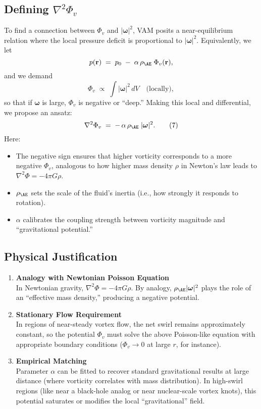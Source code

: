 \documentclass[aps,preprint,superscriptaddress]{revtex4-2}
\begin{document}
    \subsection{Defining \(\nabla^2 \Phi_v\)}
    To find a connection between \(\Phi_v\) and \(|\boldsymbol{\omega}|^2\), VAM posits a near-equilibrium relation where the local pressure deficit is proportional to \(|\boldsymbol{\omega}|^2\). Equivalently, we let
    \[
        p(\mathbf{r})
        \;=\;
        p_0
        \;-\;
        \alpha\,\rho_{\mathrm{\AE}}
        \;\Phi_v(\mathbf{r}),
    \]
    and we demand
    \[
        \Phi_v
        \;\propto\;
        \int |\boldsymbol{\omega}|^2 \,dV
        \quad
        \text{(locally)},
    \]
    so that if \(\boldsymbol{\omega}\) is large, \(\Phi_v\) is negative or “deep.”  Making this local and differential, we propose an ansatz:
    \[
        \nabla^2 \Phi_v
        \;=\;
        -\,\alpha\,\rho_{\mathrm{\AE}}\;\lvert \boldsymbol{\omega}\rvert^2.
        \tag{7}
    \]
    Here:
    \begin{itemize}
        \item The negative sign ensures that higher vorticity corresponds to a more negative \(\Phi_v\), analogous to how higher mass density \(\rho\) in Newton’s law leads to \(\nabla^2 \Phi = -4\pi G\rho\).
        \item \(\rho_{\mathrm{\AE}}\) sets the scale of the fluid’s inertia (i.e., how strongly it responds to rotation).
        \item \(\alpha\) calibrates the coupling strength between vorticity magnitude and “gravitational potential.”
    \end{itemize}

    \subsection{Physical Justification}
    \begin{enumerate}
        \item \textbf{Analogy with Newtonian Poisson Equation} \\
    In Newtonian gravity, \(\nabla^2 \Phi = -4\pi G\rho\). By analogy, \(\rho_{\mathrm{\AE}}|\boldsymbol{\omega}|^2\) plays the role of an “effective mass density,” producing a negative potential.
        \item \textbf{Stationary Flow Requirement} \\
    In regions of near-steady vortex flow, the net swirl remains approximately constant, so the potential \(\Phi_v\) must solve the above Poisson-like equation with appropriate boundary conditions (\(\Phi_v \to 0\) at large \(r\), for instance).
        \item \textbf{Empirical Matching} \\
    Parameter \(\alpha\) can be fitted to recover standard gravitational results at large distance (where vorticity correlates with mass distribution). In high-swirl regions (like near a black-hole analog or near nuclear-scale vortex knots), this potential saturates or modifies the local “gravitational” field.
    \end{enumerate}
\end{document}
